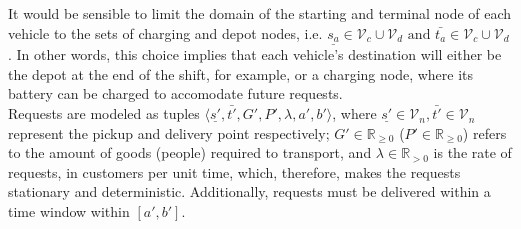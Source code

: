 It would be sensible to limit the domain of the starting and terminal node of each vehicle to the sets of charging and depot nodes, i.e. $\underline{s_a}\in\mathcal{V}_c \cup \mathcal{V}_d \text{ and } \bar{t_a}\in \mathcal{V}_c \cup \mathcal{V}_d$. In other words, this choice implies that each vehicle's destination will either be the depot at the end of the shift, for example, or a charging node, where its battery can be charged to accomodate future requests. \\
Requests are modeled as tuples $\langle \underline{s'},\bar{t'}, G', P',\lambda, a', b'\rangle$, where  $\underline{s'} \in \mathcal{V}_n,\bar{t'} \in \mathcal{V}_n$ represent the pickup and delivery point respectively; $G'\in \mathbb{R}_{\ge0}$ ($P'\in \mathbb{R}_{\ge0}$) refers to the amount of goods (people) required to transport,  and $\lambda \in \mathbb{R}_{>0}$ is the rate of requests, in customers per unit time, which, therefore, makes the requests stationary and deterministic. Additionally, requests must be delivered within a time window within $[a',b']$. \\



